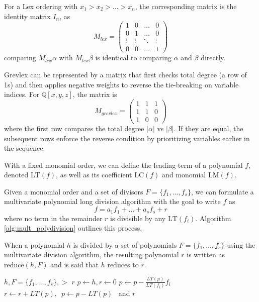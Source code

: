 \begin{example}
    For a Lex ordering with $x_1 > x_2 > \dots > x_n$, the corresponding matrix is the identity matrix $I_n$, as
    $$
    M_{lex} = \begin{pmatrix} 1 & 0 & \dots & 0 \\ 0 & 1 & \dots & 0 \\ \vdots & \vdots & \ddots & \vdots \\ 0 & 0 & \dots & 1 \end{pmatrix}
    $$
    comparing $M_{lex}\alpha$ with $M_{lex}\beta$ is identical to comparing $\alpha$ and $\beta$ directly.

    Grevlex can be represented by a matrix that first checks total degree (a row of 1s) and then applies negative weights to reverse the tie-breaking on variable indices. For $\mathbb{Q}[x, y, z]$, the matrix is 
    $$
    M_{grevlex} = \begin{pmatrix} 1 & 1 & 1 \\ 1 & 1 & 0 \\ 1 & 0 & 0 \end{pmatrix}
    $$
    where the first row compares the total degree $|\alpha|$ vs $|\beta|$. If they are equal, the subsequent rows enforce the reverse condition by prioritizing variables earlier in the sequence.
\end{example}

With a fixed monomial order, we can define the leading term of a polynomial $f$, denoted $\text{LT}(f)$, as well as its coefficient $\text{LC}(f)$ and monomial $\text{LM}(f)$.

Given a monomial order and a set of divisors $F = \{f_1, \dots, f_s\}$, we can formulate a multivariate polynomial long division algorithm with the goal to write $f$ as
$$ f = a_1 f_1 + \dots + a_s f_s + r $$
where no term in the remainder $r$ is divisible by any $\text{LT}(f_i)$. Algorithm \ref{alg:mult_polydivision} outlines this process.

\begin{definition}[Reduction]
\label{def:reduction}
When a polynomial $h$ is divided by a set of polynomials $F = \{f_1, \dots, f_s\}$ using the multivariate division algorithm, the resulting polynomial $r$ is written as $\text{reduce}(h, F)$ and is said that $h$ reduces to $r$.
\end{definition}

\begin{algorithm}[H]
\caption{Multivariate Division Algorithm} 
\label{alg:mult_polydivision}
\begin{algorithmic}
\Require $h, F=\{f_1, \dots, f_s\}, >$
\Ensure $r$
\State $p \gets h, r \gets 0$
        \State $p \gets p - \frac{LT(p)}{LT(f_i)} f_i$
    \Else
        \State $r \gets r + LT(p), \enspace p \gets p - LT(p)$
    \EndIf
\EndWhile \ and \Return $r$
\end{algorithmic}
\end{algorithm}

